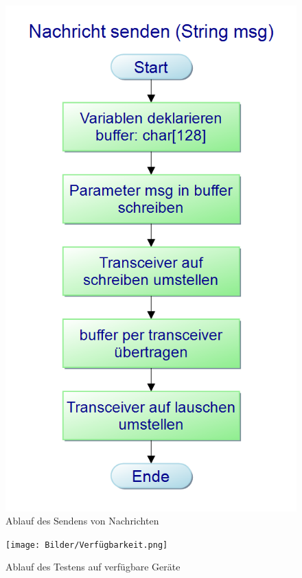 \documentclass[a4paper, 11pt]{scrartcl}
\begin{document}
\begin{small}
\begin{figure}[H]
    \begin{center}
        \includegraphics[scale=0.4]{Bilder/Nachricht senden (String msg).png}
        \caption{Ablauf des Sendens von Nachrichten}\label{diag:send_pap}
    \end{center}
\end{figure}

\begin{figure}[H]
    \begin{center}
        \texttt{[image: Bilder/Verfügbarkeit.png]}
        \caption{Ablauf des Testens auf verfügbare Geräte}\label{diag:available_pap}
    \end{center}
\end{figure}


\end{small}
\end{document}
